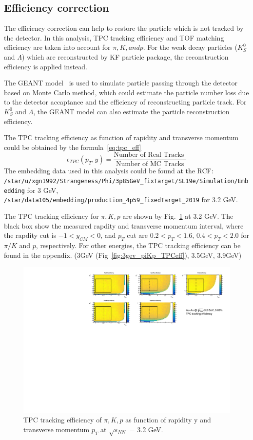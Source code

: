 \subsection{Efficiency correction}


The efficiency correction can help to restore the particle which is not tracked by the detector.
In this analysis, TPC tracking efficiency and TOF matching efficiency are taken into account for $\pi, K, and p$.
For the weak decay particles ($K^{0}_{S}$ and $\Lambda$) which are reconstructed by KF particle package, 
the reconstruction efficiency is applied instead. 

The GEANT model~\cite{AGOSTINELLI2003250} is used to simulate particle passing through the detector based on Monte Carlo method, 
which could estimate the particle number loss due to the detector accaptance and the efficiency of reconstructing particle track.
For $K^0_S$ and $\Lambda$, the GEANT model can also estimate the particle reconstruction efficiency.

The TPC tracking efficiency as function of rapidity and transverse momentum could be obtained by the formula~\ref{eq:tpc_eff}
\begin{equation}
    \epsilon_{TPC}\left(p_T, y\right)=\frac{\text {Number of Real Tracks }}{\text { Number of MC Tracks }}
\label{eq:tpc_eff}
\end{equation}
The embedding data used in this analysis could be found at the RCF: \\
\verb|/star/u/xgn1992/Strangeness/Phi/3p85GeV_fixTarget/SL19e/Simulation/Embedding| for 3 GeV,
\verb|/star/data105/embedding/production_4p59_fixedTarget_2019| for 3.2 GeV.

The TPC tracking efficiency for $\pi, K, p$ are shown by Fig.~\ref{fig:3p2_piKp_TPCeff} at 3.2 GeV. 
The black box show the measured rapdity and transverse momentum interval, where the rapdity cut is $-1<y_{CM}<0$, 
and $p_T$ cut are $0.2<p_T<1.6$, $0.4<p_T<2.0$ for $\pi/K$ and $p$, respectively. 
For other energies, the TPC tracking efficiency can be found in the appendix. (3GeV (Fig~\ref{fig:3gev_piKp_TPCeff}), 3.5GeV, 3.9GeV)

\begin{figure}[hbt!]
\centering
\includegraphics[width=0.65\linewidth]{figures/chapter02/3p2gev_TPC_eff.pdf}
\caption{TPC tracking efficiency of $\pi, K, p$ as function of rapidity y and transverse momentum $p_T$ at $\sqrt{s_{NN}}$ = 3.2 GeV.}
\label{fig:3p2_piKp_TPCeff}
\end{figure}

